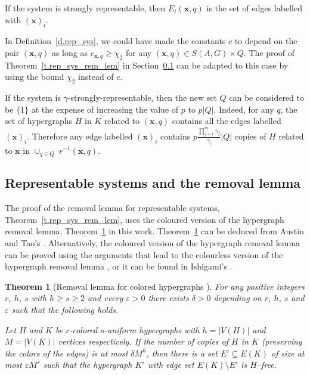 \documentclass[10pt]{article}
\newtheorem{theorem}{Theorem}
\begin{document}
If the system is strongly representable, then $E_{i}(\mathbf{x},q)$ is the set of edges labelled with $(\mathbf{x})_i$.

In Definition~\ref{d.rep_sys}, we could have made the constants $c$ to depend on the pair $(\mathbf{x},q)$ as long as $c_{\mathbf{x},q}\geq \chi_2$ for any $(\mathbf{x},q)\in S(A,G)\times Q$. The proof of Theorem~\ref{t.rep_sys_rem_lem} in Section~\ref{s.rep_sys_proof} can be adapted to this case by using the bound $\chi_2$ instead of $c$.

If the system is $\gamma$-strongly-representable, then the new set $Q$ can be considered to be $\{1\}$ at the expense of increasing the value of $p$ to $p|Q|$. Indeed, for any $q$, the set of hypergraphs $H$ in $K$ related to $(\mathbf{x},q)$ contains all the edges labelled $(\mathbf{x})_i$. Therefore any edge labelled $(\mathbf{x})_i$ contains $p\frac{\prod_{j=1}^m\gamma_j}{\gamma_i}|Q|$ copies of $H$ related to $\mathbf{x}$ in $\cup_{q\in Q} \;r^{-1}(\mathbf{x},q)$.






\subsection{Representable systems and the removal lemma} \label{s.rep_sys_proof}


The proof of the removal lemma for representable systems, Theorem~\ref{t.rep_sys_rem_lem}, uses the coloured version of the hypergraph removal lemma, Theorem~\ref{t.rem_lem_edge_color_hyper} in this work.
Theorem~\ref{t.rem_lem_edge_color_hyper} can be deduced from Austin and Tao's \cite[Theorem~1.5]{austao10}. Alternatively, the coloured version of the hypergraph removal lemma can be proved using the arguments that lead to the colourless version of the hypergraph removal lemma \cite{elesze12,gow07,rodletal,tao06}, or it can be found in Ishigami's \cite{ishi09}.

\begin{theorem}[Removal lemma for colored hypergraphs \cite{austao10}] \label{t.rem_lem_edge_color_hyper}
 For any positive integers $r$, $h$, $s$ with  $h\ge s\ge 2$ and every $\varepsilon >0$ there exists $\delta>0$
 depending on $r$, $h$, $s$ and $\varepsilon$  such that
the following holds.

Let $H$ and $K$ be $r$-colored $s$-uniform hypergraphs with $h=|V(H)|$ and   $M=|V(K)|$ vertices respectively.
If the number of copies of $H$ in $K$ (preserving the colors of the
edges) is at most $\delta M^h$, then there is a set $E'\subseteq
E(K)$ of size at most $\varepsilon M^{s}$ such that the hypergraph
$K'$ with edge set $E(K)\setminus E'$ is $H$--free.
\end{theorem}
\end{document}
